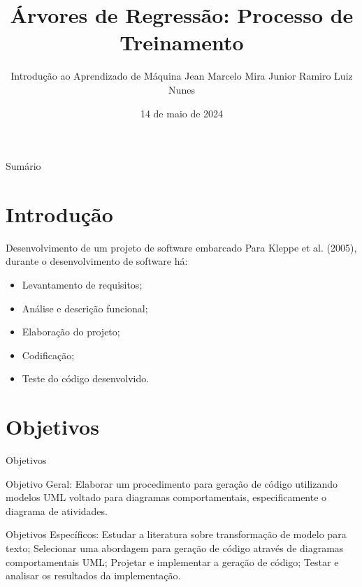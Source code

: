 \documentclass[handout,aspectratio = 169]{beamer}
\title{Árvores de Regressão: Processo de Treinamento}
\date{14 de maio de 2024}
\author[]{
    Introdução ao Aprendizado de Máquina
    \newline
    \newline Jean Marcelo Mira Junior
    \newline Ramiro Luiz Nunes
}
\begin{document}

\frame{\titlepage}
\section[]{}
\begin{frame}{Sumário}
  \tableofcontents
\end{frame}


\section{Introdução}

\begin{frame}{Desenvolvimento de um projeto de software embarcado}
    Para Kleppe et al. (2005), durante o desenvolvimento de software há:
    \begin{itemize}
        \item Levantamento de requisitos;
        \item Análise e descrição funcional;
        \item Elaboração do projeto;
        \item Codificação;
        \item Teste do código desenvolvido.
    \end{itemize}
\end{frame}

\section{Objetivos}
\begin{frame}{Objetivos}
    \begin{outline}
        \1 Objetivo Geral:
        Elaborar um procedimento para geração de código utilizando modelos UML voltado para diagramas comportamentais, especificamente o diagrama de atividades.
    \end{outline}

    \begin{outline}
        \1 Objetivos Específicos:
        \2 Estudar a literatura sobre transformação de modelo para texto;
        \2 Selecionar uma abordagem para geração de código através de diagramas comportamentais UML;
        \2 Projetar e implementar a geração de código;
        \2 Testar e analisar os resultados da implementação.
    \end{outline}
\end{frame}
\end{document}
